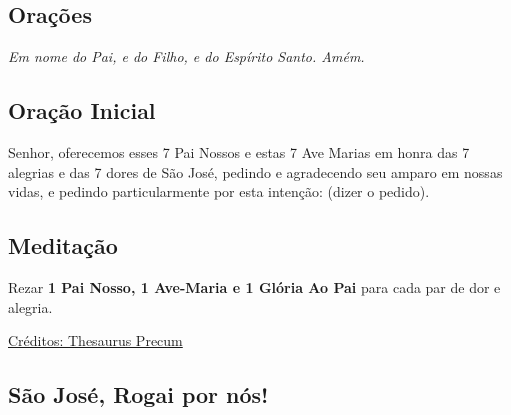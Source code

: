 \documentclass[18pt]{article}
\begin{document}
\begin{justify}

\begin{center}
 \section*{Orações}\label{sec:Orações} %
\textit{Em nome do Pai, e do Filho, e do Espírito Santo. Amém.}
\end{center}

\subsection*{Oração Inicial}
Senhor, oferecemos esses 7 Pai Nossos e estas 7 Ave Marias em honra das 7 alegrias e das 7 dores de São José, pedindo e agradecendo seu amparo em nossas vidas, e pedindo particularmente por esta intenção: (dizer o pedido).


\subsection*{Meditação}
Rezar \textbf{1 Pai Nosso, 1 Ave-Maria e 1 Glória Ao Pai} para cada par de dor e alegria.

\vfill
\href{https://precantur.blogspot.com/2016/03/suplica-a-sao-Jose.html}{Créditos: Thesaurus Precum}

\vfill
\begin{center}
\section*{São José, Rogai por nós!}
\end{center}


\vfill


\end{justify}
\end{document}
